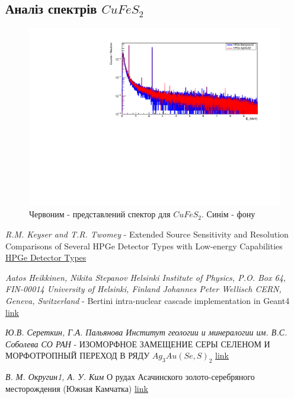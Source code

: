 \documentclass[a4paper, 14pt]{article}
\numberwithin{equation}{section}
\numberwithin{table}{section}
\begin{document}
\subsection{Аналіз спектрів $CuFeS_2$}
	\begin{figure}[hbt!]
		\centering \includegraphics[width=1\textwidth]{res/smCuFeS2FonAll.pdf}
		\caption{Червоним - представлений спектор для $CuFeS_2$. Синім - фону} 
		\label{ris:CuFeS_2Fon}	
	\end{figure} 	
		
\newpage	
\begin{thebibliography}{}
	
	 \textit{R.M. Keyser and T.R. Twomey} - Extended Source Sensitivity and Resolution Comparisons of Several HPGe Detector Types with Low-energy Capabilities \\
	\href{https://www.ortec-online.com/-/media/ametekortec/technical%20papers/high%20purity%20germanium%20detector%20applications%20and%20technology%20developements/extended-source-sensitivity-resolution-comparisons-several-hpge-detector-types-low-energy-capabilities.pdf?la=en}{ HPGe Detector Types}
		
	 \textit{Aatos Heikkinen, Nikita Stepanov Helsinki Institute of Physics, P.O. Box 64, FIN-00014 University of Helsinki, Finland Johannes Peter Wellisch CERN, Geneva, Switzerland} - Bertini intra-nuclear cascade implementation in Geant4
	\href{https://www.slac.stanford.edu/econf/C0303241/proc/papers/MOMT008.PDF}{link}
	
	 \textit{Ю.В. Сереткин, Г.А. Пальянова Институт геологии и минералогии им. В.С. Соболева СО РАН} - ИЗОМОРФНОЕ ЗАМЕЩЕНИЕ СЕРЫ СЕЛЕНОМ И МОРФОТРОПНЫЙ ПЕРЕХОД В РЯДУ $Ag_3Au(Se,S)_2$
	\href{https://www.sibran.ru/upload/iblock/478/478309021b63c0dc426e82c4025e6471.pdf}{link}
	
	 \textit{В. М. Округин1, А. У. Ким} О рудах Асачинского золото-серебряного месторождения
	(Южная Камчатка)
	\href{http://www.kscnet.ru/ivs/publication/volc_day/2014/art51.pdf}{link}
	
\end{thebibliography}
\end{document}
